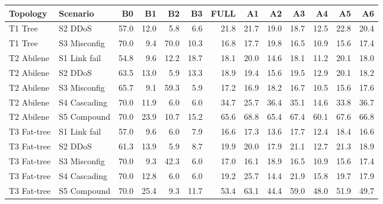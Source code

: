 \begin{tabular}{llrrrrrrrrrrr}
\toprule
Topology & Scenario & B0 & B1 & B2 & B3 & FULL & A1 & A2 & A3 & A4 & A5 & A6 \\
\midrule
T1 Tree & S2 DDoS & 57.0 & 12.0 & 5.8 & 6.6 & 21.8 & 21.7 & 19.0 & 18.7 & 12.5 & 22.8 & 20.4 \\
T1 Tree & S3 Misconfig & 70.0 & 9.4 & 70.0 & 10.3 & 16.8 & 17.7 & 19.8 & 16.5 & 10.9 & 15.6 & 17.4 \\
\midrule
T2 Abilene & S1 Link fail & 54.8 & 9.6 & 12.2 & 18.7 & 18.1 & 20.0 & 14.6 & 18.1 & 11.2 & 20.1 & 18.0 \\
T2 Abilene & S2 DDoS & 63.5 & 13.0 & 5.9 & 13.3 & 18.9 & 19.4 & 15.6 & 19.5 & 12.9 & 20.1 & 18.2 \\
T2 Abilene & S3 Misconfig & 65.7 & 9.1 & 59.3 & 5.9 & 17.2 & 16.9 & 18.2 & 16.7 & 10.5 & 15.6 & 17.6 \\
T2 Abilene & S4 Cascading & 70.0 & 11.9 & 6.0 & 6.0 & 34.7 & 25.7 & 36.4 & 35.1 & 14.6 & 33.8 & 36.7 \\
T2 Abilene & S5 Compound & 70.0 & 23.9 & 10.7 & 15.2 & 65.6 & 68.8 & 65.4 & 67.4 & 60.1 & 67.6 & 66.8 \\
\midrule
T3 Fat-tree & S1 Link fail & 57.0 & 9.6 & 6.0 & 7.9 & 16.6 & 17.3 & 13.6 & 17.7 & 12.4 & 18.4 & 16.6 \\
T3 Fat-tree & S2 DDoS & 61.3 & 13.9 & 5.9 & 8.7 & 19.9 & 20.0 & 17.9 & 21.1 & 12.7 & 21.3 & 18.9 \\
T3 Fat-tree & S3 Misconfig & 70.0 & 9.3 & 42.3 & 6.0 & 17.0 & 16.1 & 18.9 & 16.5 & 10.9 & 15.6 & 17.4 \\
T3 Fat-tree & S4 Cascading & 70.0 & 12.8 & 6.0 & 6.0 & 19.2 & 25.7 & 14.4 & 21.9 & 15.8 & 19.7 & 17.9 \\
T3 Fat-tree & S5 Compound & 70.0 & 25.4 & 9.3 & 11.7 & 53.4 & 63.1 & 44.4 & 59.0 & 48.0 & 51.9 & 49.7 \\
\bottomrule
\end{tabular}
